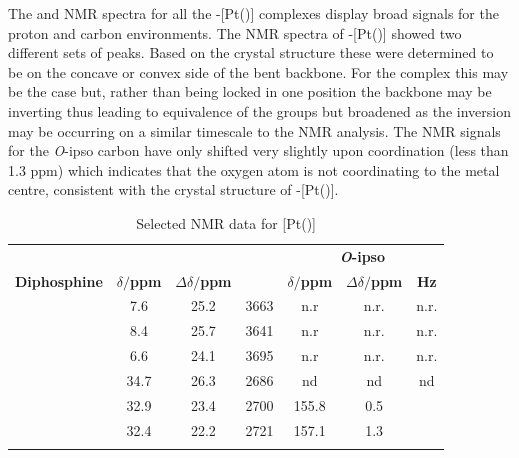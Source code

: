 The \proton{} and \carbon{} NMR spectra for all the \trans-[Pt(\tBuxantphos)] complexes display broad signals for the \tBu{} proton and carbon environments.  The NMR spectra of \trans-[Pt(\tButhixantphos)] showed two different sets of \tBu{} peaks.  Based on the crystal structure these were determined to be on the concave or convex side of the bent backbone.  For the \tBuxantphos{} complex this may be the case but, rather than being locked in one position the backbone may be inverting thus leading to equivalence of the \tBu{} groups but broadened as the inversion may be occurring on a similar timescale to the NMR analysis.  The \carbon{} NMR signals for the \emph{O}-ipso carbon have only shifted very slightly upon coordination (less than 1.3 ppm) which indicates that the oxygen atom is not coordinating to the metal centre, consistent with the crystal structure of \trans-[Pt(\tButhixantphos)].  

\begin{table}[htbp]
\caption[Selected NMR data for [Pt(\tBuxantphos)\ce{Cl2}{]}]{Selected NMR data for [Pt(\tBuxantphos)]}
\vspace{1em}
\label{table:PtCl2NMR}
\small
\begin{center}
\begin{tabular}{c c c c c c c}
\toprule{}
	~~ & \multicolumn{3}{c}{\bfseries{\phosphorus}} & \multicolumn{3}{c}{\bfseries{\carbon{} \emph{O}-ipso}}\\
	\cmidrule(lr){2-4} \cmidrule(lr){5-7}
	\bfseries{Diphosphine}&\bfseries{$\delta/$ppm}&\bfseries{$\Delta\delta/$ppm}&\bfseries{\JPtP}&\bfseries{$\delta/$ppm}&\bfseries{$\Delta\delta/$ppm}&\bfseries{\J{} Hz} \\
	\midrule{}
	\PhSixantphos\cite{Kranenburg1998b}	& 7.6	   & 25.2 & 3663 & n.r & n.r. & n.r.\\
	\PhThixantphos	\cite{Kranenburg1998b}	& 8.4   & 25.7 & 3641 & n.r & n.r. & n.r.\\
	\PhXantphos\cite{Kranenburg1998b}		& 6.6	   & 24.1 & 3695 & n.r & n.r. & n.r.\\
	\tBuSixantphos 		& 34.7 & 26.3 & 2686 & nd & nd & nd \\
	\tBuThixantphos 	& 32.9 & 23.4 & 2700 & 155.8 & 0.5 & \fixme{XXX}\\
	\tBuXantphos		& 32.4 & 22.2 & 2721 & 157.1 & 1.3 & \fixme{XXX}\\
	\bottomrule{}
\end{tabular}
\end{center}
\end{table}

